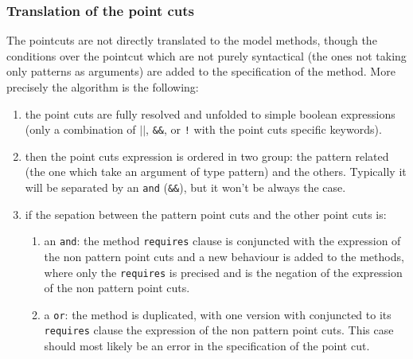 \subsubsection{Translation of the point cuts}
The pointcuts are not directly translated to the model methods, though
the conditions over the pointcut which are not purely syntactical (the
ones not taking only patterns as arguments) are added to the
specification of the method.  More precisely the algorithm is the
following:
\begin{enumerate}
\item 
the point cuts are fully resolved and unfolded to simple boolean
expressions (only a combination of {\tt $||$}, {\tt \&\&}, or {\tt !}
with the point cuts specific keywords).
\item 
then the point cuts expression is ordered in two group: the pattern
related (the one which take an argument of type pattern) and the
others. Typically it will be separated by an {\tt and} ({\tt \&\&}),
but it won't be always the case.
\item 
if the sepation between the pattern point cuts and the other point
cuts is:
\begin{enumerate}
\item 
an {\tt and}: the method {\tt requires} clause is conjuncted with the
expression of the non pattern point cuts and a new behaviour is added
to the methods, where only the {\tt requires} is precised and is the
negation of the expression of the non pattern point cuts.
\item 
a {\tt or}: the method is duplicated, with one version with conjuncted
 to its {\tt requires} clause the expression of the non pattern point
 cuts. This case should most likely be an error in the specification
 of the point cut.
\end{enumerate}
\end{enumerate}





